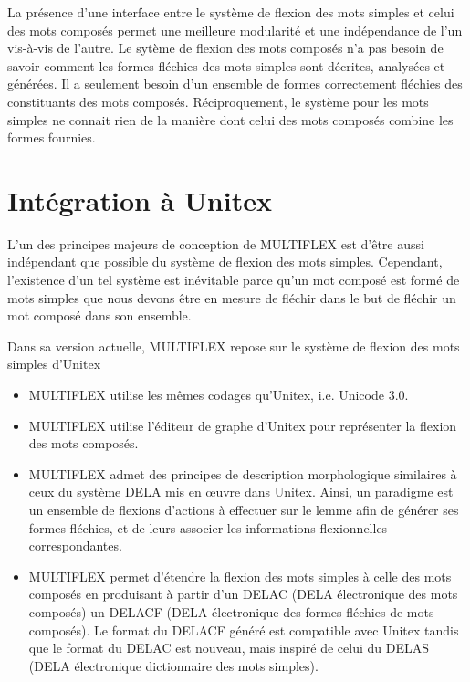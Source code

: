 \bigskip
\noindent La présence d'une interface entre le système de flexion des mots simples et celui des mots
composés permet une meilleure modularité et une indépendance de l'un vis-à-vis de l'autre. 
Le sytème de flexion des mots composés n'a pas besoin de savoir comment les formes fléchies des mots
simples sont décrites, analysées et générées. Il a seulement besoin d'un ensemble de formes
correctement fléchies des constituants des mots composés. Réciproquement, le système pour les mots
simples ne connait rien de la manière dont celui des mots composés combine les formes fournies.        
 
\section{Intégration à Unitex}
\label{section:UNITEXinterface}
L'un des principes majeurs de conception de MULTIFLEX est d'être aussi indépendant que possible du
système de flexion des mots simples. Cependant, l'existence d'un tel système est inévitable parce
qu'un mot composé est formé de mots simples que nous devons être en mesure de fléchir dans le but
de fléchir un mot composé dans son ensemble.

\bigskip
\noindent Dans sa version actuelle, MULTIFLEX repose sur le système de flexion des mots simples
d'Unitex

\begin{itemize}
\item MULTIFLEX utilise les mêmes codages qu'Unitex, i.e. Unicode 3.0.
\item MULTIFLEX utilise l'éditeur de graphe d'Unitex pour représenter la flexion des mots composés.
\item MULTIFLEX admet des principes de description morphologique similaires à ceux 
du système DELA mis en {\oe}uvre dans Unitex. Ainsi, un paradigme est un ensemble de flexions
d'actions à effectuer sur le lemme afin de générer ses formes fléchies, et de leurs associer
les informations flexionnelles correspondantes.
\item MULTIFLEX permet d'étendre la flexion des mots simples à celle des mots composés en produisant
à partir d'un DELAC (DELA électronique des mots composés) un DELACF (DELA électronique des formes
fléchies de mots composés).
Le format du DELACF généré est compatible avec Unitex tandis que le format du DELAC est nouveau,
mais inspiré de celui du DELAS (DELA électronique dictionnaire des mots simples).
\end{itemize}


